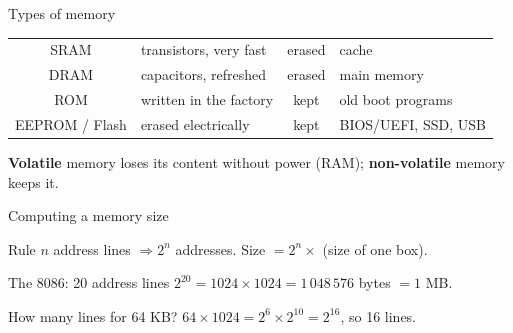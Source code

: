 \documentclass[aspectratio=169, 11pt, t, xcolor={table}]{beamer}
\begin{document}
\begin{frame}{Types of memory}
    \begin{center}
    \small
    \begin{tabularx}{0.95\linewidth}{|c|L|c|L|}
        \hline
         &  &  &  \\ \hline
        SRAM & transistors, very fast & erased & cache \\ \hline
        DRAM & capacitors, refreshed & erased & main memory \\ \hline
        ROM & written in the factory & kept & old boot programs \\ \hline
        EEPROM / Flash & erased electrically & kept & BIOS/UEFI, SSD, USB \\ \hline
    \end{tabularx}
    \end{center}
    \textbf{Volatile} memory loses its content without power (RAM); \textbf{non-volatile} memory keeps it.
\end{frame}

\begin{frame}{Computing a memory size}
    \begin{tbox}{\faLightbulb\quad Rule}
        $n$ address lines $\Rightarrow 2^n$ addresses. \quad Size $= 2^n \times$ (size of one box).
    \end{tbox}
    \begin{gbox}{\faShoePrints\quad The 8086: 20 address lines}
        $2^{20} = 1024 \times 1024 = 1\,048\,576$ bytes $= 1$ MB.
    \end{gbox}
    \begin{gbox}{\faShoePrints\quad How many lines for 64 KB?}
        $64 \times 1024 = 2^6 \times 2^{10} = 2^{16}$, so 16 lines.
    \end{gbox}
\end{frame}
\end{document}

